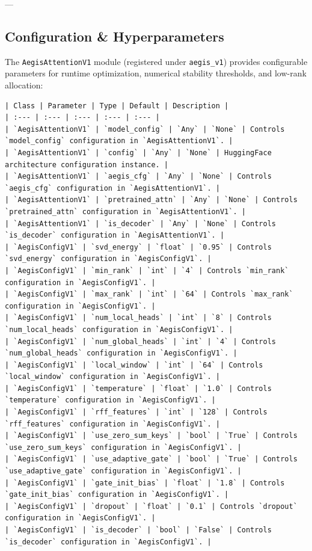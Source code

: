 ---

\subsection{Configuration \& Hyperparameters}
The \texttt{AegisAttentionV1} module (registered under \texttt{aegis\_v1}) provides configurable parameters for runtime optimization, numerical stability thresholds, and low-rank allocation:

\begin{verbatim}
| Class | Parameter | Type | Default | Description |
| :--- | :--- | :--- | :--- | :--- |
| `AegisAttentionV1` | `model_config` | `Any` | `None` | Controls `model_config` configuration in `AegisAttentionV1`. |
| `AegisAttentionV1` | `config` | `Any` | `None` | HuggingFace architecture configuration instance. |
| `AegisAttentionV1` | `aegis_cfg` | `Any` | `None` | Controls `aegis_cfg` configuration in `AegisAttentionV1`. |
| `AegisAttentionV1` | `pretrained_attn` | `Any` | `None` | Controls `pretrained_attn` configuration in `AegisAttentionV1`. |
| `AegisAttentionV1` | `is_decoder` | `Any` | `None` | Controls `is_decoder` configuration in `AegisAttentionV1`. |
| `AegisConfigV1` | `svd_energy` | `float` | `0.95` | Controls `svd_energy` configuration in `AegisConfigV1`. |
| `AegisConfigV1` | `min_rank` | `int` | `4` | Controls `min_rank` configuration in `AegisConfigV1`. |
| `AegisConfigV1` | `max_rank` | `int` | `64` | Controls `max_rank` configuration in `AegisConfigV1`. |
| `AegisConfigV1` | `num_local_heads` | `int` | `8` | Controls `num_local_heads` configuration in `AegisConfigV1`. |
| `AegisConfigV1` | `num_global_heads` | `int` | `4` | Controls `num_global_heads` configuration in `AegisConfigV1`. |
| `AegisConfigV1` | `local_window` | `int` | `64` | Controls `local_window` configuration in `AegisConfigV1`. |
| `AegisConfigV1` | `temperature` | `float` | `1.0` | Controls `temperature` configuration in `AegisConfigV1`. |
| `AegisConfigV1` | `rff_features` | `int` | `128` | Controls `rff_features` configuration in `AegisConfigV1`. |
| `AegisConfigV1` | `use_zero_sum_keys` | `bool` | `True` | Controls `use_zero_sum_keys` configuration in `AegisConfigV1`. |
| `AegisConfigV1` | `use_adaptive_gate` | `bool` | `True` | Controls `use_adaptive_gate` configuration in `AegisConfigV1`. |
| `AegisConfigV1` | `gate_init_bias` | `float` | `1.8` | Controls `gate_init_bias` configuration in `AegisConfigV1`. |
| `AegisConfigV1` | `dropout` | `float` | `0.1` | Controls `dropout` configuration in `AegisConfigV1`. |
| `AegisConfigV1` | `is_decoder` | `bool` | `False` | Controls `is_decoder` configuration in `AegisConfigV1`. |

\end{verbatim}
